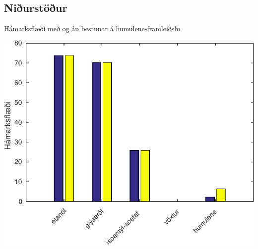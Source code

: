 \documentclass[11pt]{article}
\makeatletter
\newenvironment{figureonecolumn}{\begin{minipage}{\linewidth}\begin{center}\def\@captype{figure}}{\end{center}\end{minipage}}
\makeatother
\begin{document}
\begin{multicols}{2}
\section{Niðurstöður}


\begin{figureonecolumn}
\caption{Hámarksflæði með og án bestunar á humulene-framleiðslu}
\includegraphics[width=\linewidth]{Pics/BrewingMetMaxFlow}
\end{figureonecolumn}


\end{multicols}
\end{document}
